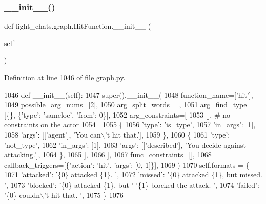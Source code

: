 \subsubsection{\texorpdfstring{\+\_\+\+\_\+init\+\_\+\+\_\+()}{\_\_init\_\_()}}
{\footnotesize\ttfamily def light\+\_\+chats.\+graph.\+Hit\+Function.\+\_\+\+\_\+init\+\_\+\+\_\+ (\begin{DoxyParamCaption}\item[{}]{self }\end{DoxyParamCaption})}



Definition at line 1046 of file graph.\+py.


\begin{DoxyCode}
1046     \textcolor{keyword}{def }\_\_init\_\_(self):
1047         super().\_\_init\_\_(
1048             function\_name=[\textcolor{stringliteral}{'hit'}],
1049             possible\_arg\_nums=[2],
1050             arg\_split\_words=[],
1051             arg\_find\_type=[\{\}, \{\textcolor{stringliteral}{'type'}: \textcolor{stringliteral}{'sameloc'}, \textcolor{stringliteral}{'from'}: 0\}],
1052             arg\_constraints=[
1053                 [],  \textcolor{comment}{# no constraints on the actor}
1054                 [
1055                     \{
1056                         \textcolor{stringliteral}{'type'}: \textcolor{stringliteral}{'is\_type'},
1057                         \textcolor{stringliteral}{'in\_args'}: [1],
1058                         \textcolor{stringliteral}{'args'}: [[\textcolor{stringliteral}{'agent'}], \textcolor{stringliteral}{'You can\(\backslash\)'t hit that.'}],
1059                     \},
1060                     \{
1061                         \textcolor{stringliteral}{'type'}: \textcolor{stringliteral}{'not\_type'},
1062                         \textcolor{stringliteral}{'in\_args'}: [1],
1063                         \textcolor{stringliteral}{'args'}: [[\textcolor{stringliteral}{'described'}], \textcolor{stringliteral}{'You decide against attacking.'}],
1064                     \},
1065                 ],
1066             ],
1067             func\_constraints=[],
1068             callback\_triggers=[\{\textcolor{stringliteral}{'action'}: \textcolor{stringliteral}{'hit'}, \textcolor{stringliteral}{'args'}: [0, 1]\}],
1069         )
1070         self.formats = \{
1071             \textcolor{stringliteral}{'attacked'}: \textcolor{stringliteral}{'\{0\} attacked \{1\}. '},
1072             \textcolor{stringliteral}{'missed'}: \textcolor{stringliteral}{'\{0\} attacked \{1\}, but missed. '},
1073             \textcolor{stringliteral}{'blocked'}: \textcolor{stringliteral}{'\{0\} attacked \{1\}, but '} \textcolor{stringliteral}{'\{1\} blocked the attack. '},
1074             \textcolor{stringliteral}{'failed'}: \textcolor{stringliteral}{'\{0\} couldn\(\backslash\)'t hit that. '},
1075         \}
1076 
\end{DoxyCode}


